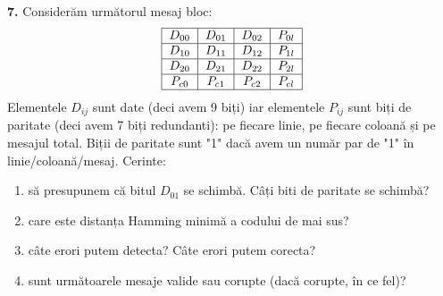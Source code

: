 \documentclass[a4paper]{article}
\begin{document}
\textbf{7.} Considerăm următorul mesaj bloc:
\[
\begin{tabular}{|c|c|c|c|}
\hline
$D_{00}$ & $D_{01}$ & $D_{02}$ & $P_{0l}$ \\
\hline
$D_{10}$ & $D_{11}$ & $D_{12}$ & $P_{1l}$ \\
\hline
$D_{20}$ & $D_{21}$ & $D_{22}$ & $P_{2l}$ \\
\hline
$P_{c0}$ & $P_{c1}$ & $P_{c2}$ & $P_{cl}$ \\
\hline
\end{tabular}
\]
Elementele $D_{ij}$ sunt date (deci avem 9 biți) iar elementele $P_{ij}$ sunt biți de paritate (deci avem 7
biți redundanti): pe fiecare linie, pe fiecare coloană și pe mesajul total.
Biții de paritate sunt "1"
dacă avem un număr par de "1" în linie/coloană/mesaj. Cerinte:
\begin{enumerate}[label=(\alph*)]
    \item să presupunem că bitul $D_{01}$ se schimbă. Câți biti de paritate se schimbă?
    \item care este distanța Hamming minimă a codului de mai sus?
    \item câte erori putem detecta? Câte erori putem corecta?
    \item sunt următoarele mesaje valide sau corupte (dacă corupte, în ce fel)?
\end{enumerate}
\end{document}
